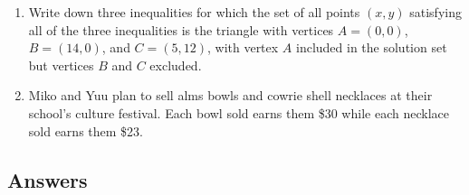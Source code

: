 \begin{enumerate}
\item Write down three inequalities for which the set of all points $(x,y)$ satisfying all of the three inequalities is the triangle with vertices $A = (0,0)$, $B = (14,0)$, and $C = (5,12)$, with vertex $A$ included in the solution set but vertices $B$ and $C$ excluded.
\item Miko and Yuu plan to sell alms bowls and cowrie shell necklaces at their school's culture festival. Each bowl sold earns them \$30 while each necklace sold earns them \$23.
\end{enumerate}



\subsection{Answers}